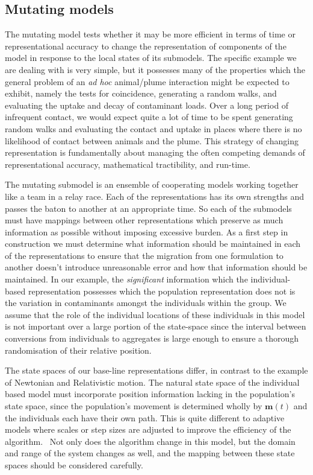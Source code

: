 \documentclass{article}
\newcommand{\tmem}[1]{{\em #1\/}}
\newcommand{\tmmathbf}[1]{\ensuremath{\boldsymbol{#1}}}
\begin{document}
\subsection{Mutating models}

The mutating model tests whether it may be more efficient in terms of time or
representational accuracy to change the representation of components of the
model in response to the local states of its submodels. The specific example
we are dealing with is very simple, but it possesses many of the properties
which the general problem of an {\tmem{ad hoc}} animal/plume interaction might
be expected to exhibit, namely the tests for coincidence, generating a random
walks, and evaluating the uptake and decay of contaminant loads. Over a long
period of infrequent contact, we would expect quite a lot of time to be spent
generating random walks and evaluating the contact and uptake in places where
there is no likelihood of contact between animals and the plume. This strategy
of changing representation is fundamentally about managing the often competing
demands of representational accuracy, mathematical tractibility, and run-time.

The mutating submodel is an ensemble of cooperating models working together
like a team in a relay race. Each of the representations has its own strengths
and passes the baton to another at an appropriate time. So each of the
submodels must have mappings between other representations which preserve as
much information as possible without imposing excessive burden. As a first
step in construction we must determine what information should be maintained
in each of the representations to ensure that the migration from one
formulation to another doesn't introduce unreasonable error and how that
information should be maintained. In our example, the {\tmem{significant}}
information which the individual-based representation possesses which the
population representation does not is the variation in contaminants amongst
the individuals within the group. We assume that the role of the individual
locations of these individuals in this model is not important over a large
portion of the state-space since the interval between conversions from
individuals to aggregates is large enough to ensure a thorough randomisation
of their relative position.

The state spaces of our base-line representations differ, in contrast to the
example of Newtonian and Relativistic motion. The natural state space of the
individual based model must incorporate position information lacking in the
population's state space, since the population's movement is determined wholly
by $\tmmathbf{m}(t)$ and the individuals each have their own path. This is
quite different to adaptive models where scales or step sizes are adjusted to
improve the efficiency of the algorithm. \ Not only does the algorithm change
in this model, but the domain and range of the system changes as well, and the
mapping between these state spaces should be considered carefully.
\end{document}
